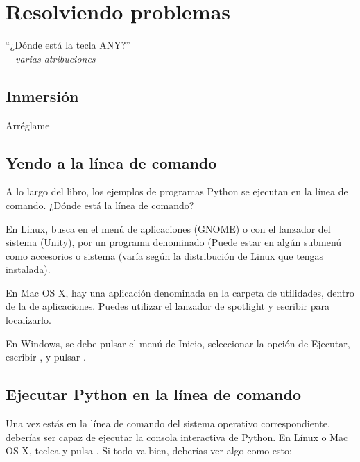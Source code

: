 
\chapter{Resolviendo problemas}

\begin{citaCap}
    ``¿Dónde está la tecla ANY?'' \\
        ---\emph{varias atribuciones}
\end{citaCap}

\section{Inmersión}

Arréglame

\section{Yendo a la línea de comando}

A lo largo del libro, los ejemplos de programas Python se ejecutan en la línea de comando. ¿Dónde está la línea de comando?

En Linux, busca en el menú de aplicaciones (GNOME) o con el lanzador del sistema (Unity), por un programa denominado  (Puede estar en algún submenú como accesorios o sistema (varía según la distribución de Linux que tengas instalada).

En Mac OS X, hay una aplicación denominada  en la carpeta de utilidades, dentro de la de aplicaciones. Puedes utilizar el lanzador de spotlight y escribir  para localizarlo.

En Windows, se debe pulsar el menú de Inicio, seleccionar la opción de Ejecutar, escribir , y pulsar .

\section{Ejecutar Python en la línea de comando}

Una vez estás en la línea de comando del sistema operativo correspondiente, deberías ser capaz de ejecutar la consola interactiva de Python. En Línux o Mac OS X, teclea  y pulsa . Si todo va bien, deberías ver algo como esto:

